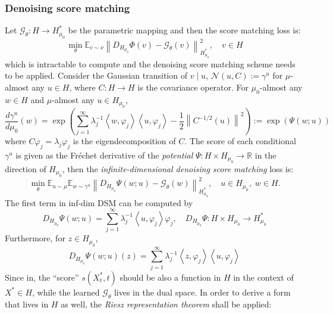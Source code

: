 \documentclass{article}
\begin{document}
\subsubsection{Denoising score matching}
Let $\mathcal{G}_\theta:H\to H^*_{\mu_0}$ be the parametric mapping and then the score matching loss is:
\begin{equation}
    \underset{\theta}{\min}\mathbb{E}_{v\sim\nu}\left\lVert D_{H_{\mu_0}}\Phi(v) - \mathcal{G}_{\theta}(v)\right\rVert^2_{H^*_{\mu_0}},\quad v\in H 
\end{equation}
which is intractable to compute and the denoising score matching scheme needs to be applied. Consider the Gaussian transition of $v\mid u$, $\mathcal{N}(u, C):=\gamma^u$ for $\mu$-almost any $u\in H$, where $C:H\to H$ is the covariance operator. For $\mu_0$-almost any $w\in H$ and $\mu$-almost any $u\in H_{\mu_0}$,
\begin{equation}
    \frac{d\gamma^u}{d\mu_0}(w) = \exp\left(\sum_{j=1}^{\infty}\lambda^{-1}_j\left\langle w,\varphi_j\right\rangle \left\langle u, \varphi_j\right\rangle - \frac{1}{2}\left\lVert C^{-1/2}(u)\right\rVert^2  \right) := \exp(\Psi(w;u))
\end{equation}
where $C\varphi_j = \lambda_j\varphi_j$ is the eigendecomposition of $C$. The score of each conditional $\gamma^u$ is given as the Fréchet derivative of the \emph{potential} $\Psi: H\times H_{\mu_0}\to\mathbb{R}$ in the direction of $H_{\mu_0}$, then the \emph{infinite-dimensional denoising score matching} loss is:
\begin{equation}
    \underset{\theta}{\min} \mathbb{E}_{u\sim\mu}\mathbb{E}_{w\sim\gamma^u}\left\lVert D_{H_{\mu_0}}\Psi(w;u) - \mathcal{G}_\theta(w)\right\rVert^2_{H^*_{\mu_0}}, \quad u\in H_{\mu_0},\; w\in H. 
\end{equation}
The first term in inf-dim DSM can be computed by
\begin{equation}
    D_{H_{\mu_0}}\Psi(w;u) = \sum_{j=1}^{\infty}\lambda^{-1}_j\left\langle u,\varphi_j\right\rangle \varphi_j,\quad D_{H_{\mu_0}}\Psi: H\times H_{\mu_0}\to H^*_{\mu_0}
\end{equation}
Furthermore, for $z\in H_{\mu_0}$,
\begin{equation}
    D_{H_{\mu_0}}\Psi(w;u)(z) = \sum_{j=1}^{\infty}\lambda^{-1}_j\left\langle z,\varphi_j\right\rangle \left\langle u, \varphi_j\right\rangle
\end{equation}
Since in, the ``score'' $s(X^*_t, t)$ should be also a function in $H$ in the context of $X^*\in H$, while the learned $\mathcal{G}_\theta$ lives in the dual space. In order to derive a form that lives in $H$ as well, the \emph{Riesz representation theorem} shall be applied:
\end{document}
